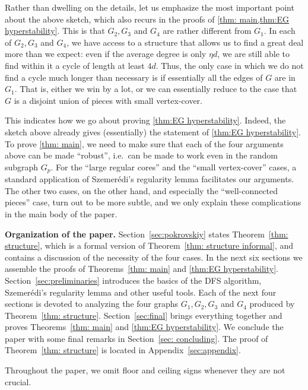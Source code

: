 \documentclass[10pt]{article}
\theoremstyle{definition}
\begin{document}
Rather than dwelling on the details, let us emphasize the most important point about the above sketch, which also recurs in the proofs of \cref{thm: main,thm:EG hyperstability}. This is that $G_2,G_3$ and $G_4$ are rather different from $G_1$. In each of $G_2,G_3$ and $G_4$, we have access to a structure that allows us to find a great deal more than we expect: even if the average degree is only $\eta d$, we are still able to find within it a cycle of length at least $4d$. Thus, the only case in which we do not find a cycle much longer than necessary is if essentially all the edges of $G$ are in $G_1$. That is, either we win by a lot, or we can essentially reduce to the case that $G$ is a disjoint union of pieces with small vertex-cover. 

This indicates how we go about proving \cref{thm:EG hyperstability}. Indeed, the sketch above already gives (essentially) the statement of \cref{thm:EG hyperstability}. To prove \cref{thm: main}, we need to make sure that each of the four arguments above can be made ``robust'', i.e.\ can be made to work even in the random subgraph $G_p$. For the ``large regular cores'' and the ``small vertex-cover'' cases, a standard application of Szemer\'edi's regularity lemma facilitates our arguments. The other two cases, on the other hand, and especially the ``well-connected pieces'' case, turn out to be more subtle, and we only explain these complications in the main body of the paper.

\vspace{4mm}
\par \noindent \textbf{Organization of the paper.} Section~\ref{sec:pokrovskiy} states Theorem~\ref{thm: structure}, which is a formal version of Theorem~\ref{thm: structure informal}, and contains a discussion of the necessity of the four cases. In the next six sections we assemble the proofs of Theorems~\ref{thm: main} and \ref{thm:EG hyperstability}.  Section~\ref{sec:preliminaries} introduces the basics of the DFS algorithm, Szemer\'edi's regularity lemma and other useful tools. Each of the next four sections is devoted to analyzing the four graphs $G_1,G_2,G_3$ and $G_4$ produced by Theorem~\ref{thm: structure}. Section~\ref{sec:final} brings everything together and proves Theorems~\ref{thm: main} and \ref{thm:EG hyperstability}. We conclude the paper with some final remarks in Section~\ref{sec: concluding}. The proof of Theorem~\ref{thm: structure} is located in Appendix~\ref{sec:appendix}.

Throughout the paper, we omit floor and ceiling signs whenever they are not crucial.
\end{document}
